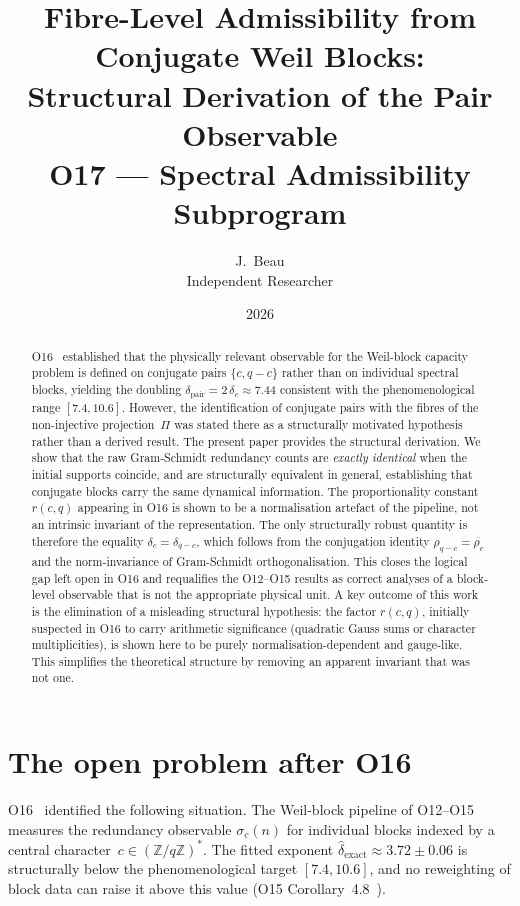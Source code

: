 \documentclass[11pt,a4paper]{article}
\title{Fibre-Level Admissibility from Conjugate Weil Blocks:\\
Structural Derivation of the Pair Observable\\
\large O17 --- Spectral Admissibility Subprogram}
\author{J.~Beau\\
\small Independent Researcher}
\date{2026}
\theoremstyle{definition}
\newcommand{\dhat}{\hat{\delta}}
\newcommand{\Fq}{(\mathbb{Z}/q\mathbb{Z})^*}
\begin{document}
  \maketitle

  \begin{abstract}
    O16~\cite{Beau2026a20} established that the physically relevant observable
    for the Weil-block capacity problem is defined on conjugate pairs
    $\{c, q-c\}$ rather than on individual spectral blocks,
    yielding the doubling $\delta_{\mathrm{pair}} = 2\,\delta_c \approx 7.44$
    consistent with the phenomenological range $[7.4, 10.6]$.
    However, the identification of conjugate pairs with the fibres of the
    non-injective projection~$\Pi$ was stated there as a structurally
    motivated hypothesis rather than a derived result.
    The present paper provides the structural derivation.
    We show that the raw Gram-Schmidt redundancy counts are
    \emph{exactly identical} when the initial supports coincide,
    and are structurally equivalent in general,
    establishing that conjugate blocks carry the same dynamical information.
    The proportionality constant $r(c,q)$ appearing in O16 is shown to
    be a normalisation artefact of the pipeline, not an intrinsic
    invariant of the representation.
    The only structurally robust quantity is therefore the equality
    $\delta_c = \delta_{q-c}$, which follows from the conjugation
    identity $\rho_{q-c} = \overline{\rho_c}$ and the norm-invariance
    of Gram-Schmidt orthogonalisation.
    This closes the logical gap left open in O16 and requalifies the
    O12--O15 results as correct analyses of a block-level observable
    that is not the appropriate physical unit.
    A key outcome of this work is the elimination of a misleading
    structural hypothesis: the factor $r(c,q)$, initially suspected
    in O16 to carry arithmetic significance (quadratic Gauss sums or
    character multiplicities), is shown here to be purely
    normalisation-dependent and gauge-like.
    This simplifies the theoretical structure by removing an
    apparent invariant that was not one.
  \end{abstract}

  \tableofcontents

  \section{The open problem after O16}
    \label{sec:problem}

    O16~\cite{Beau2026a20} identified the following situation.
    The Weil-block pipeline of O12--O15~%
    \cite{Beau2026a16,Beau2026a17,Beau2026a18,Beau2026a19}
    measures the redundancy observable $\sigma_c(n)$ for individual
    blocks indexed by a central character~$c \in \Fq$.
    The fitted exponent $\dhat_{\mathrm{exact}} \approx 3.72 \pm 0.06$
    is structurally below the phenomenological target $[7.4, 10.6]$,
    and no reweighting of block data can raise it above this value
    (O15 Corollary~4.8~\cite{Beau2026a19}).
\end{document}
